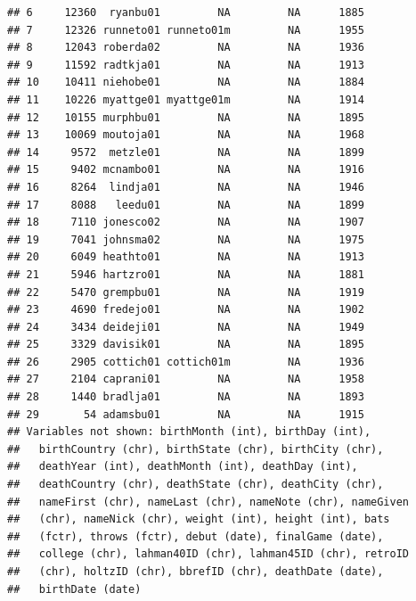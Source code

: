 \documentclass{beamer}\usepackage[]{graphicx}\usepackage[]{color}
\makeatletter
\newenvironment{kframe}{%
 \def\at@end@of@kframe{}%
 \ifinner\ifhmode%
  \def\at@end@of@kframe{\end{minipage}}%
  \begin{minipage}{\columnwidth}%
 \fi\fi%
 \def\FrameCommand##1{\hskip\@totalleftmargin \hskip-\fboxsep
 \colorbox{shadecolor}{##1}\hskip-\fboxsep
     \hskip-\linewidth \hskip-\@totalleftmargin \hskip\columnwidth}%
 \MakeFramed {\advance\hsize-\width
   \@totalleftmargin\z@ \linewidth\hsize
   \@setminipage}}%
 {\par\unskip\endMakeFramed%
 \at@end@of@kframe}
\newenvironment{knitrout}{}{} %
\makeatother
\begin{document}
\begin{frame}
\begin{knitrout}
\begin{kframe}
\begin{verbatim}
## 6     12360  ryanbu01         NA         NA      1885
## 7     12326 runneto01 runneto01m         NA      1955
## 8     12043 roberda02         NA         NA      1936
## 9     11592 radtkja01         NA         NA      1913
## 10    10411 niehobe01         NA         NA      1884
## 11    10226 myattge01 myattge01m         NA      1914
## 12    10155 murphbu01         NA         NA      1895
## 13    10069 moutoja01         NA         NA      1968
## 14     9572  metzle01         NA         NA      1899
## 15     9402 mcnambo01         NA         NA      1916
## 16     8264  lindja01         NA         NA      1946
## 17     8088   leedu01         NA         NA      1899
## 18     7110 jonesco02         NA         NA      1907
## 19     7041 johnsma02         NA         NA      1975
## 20     6049 heathto01         NA         NA      1913
## 21     5946 hartzro01         NA         NA      1881
## 22     5470 grempbu01         NA         NA      1919
## 23     4690 fredejo01         NA         NA      1902
## 24     3434 deideji01         NA         NA      1949
## 25     3329 davisik01         NA         NA      1895
## 26     2905 cottich01 cottich01m         NA      1936
## 27     2104 caprani01         NA         NA      1958
## 28     1440 bradlja01         NA         NA      1893
## 29       54 adamsbu01         NA         NA      1915
## Variables not shown: birthMonth (int), birthDay (int),
##   birthCountry (chr), birthState (chr), birthCity (chr),
##   deathYear (int), deathMonth (int), deathDay (int),
##   deathCountry (chr), deathState (chr), deathCity (chr),
##   nameFirst (chr), nameLast (chr), nameNote (chr), nameGiven
##   (chr), nameNick (chr), weight (int), height (int), bats
##   (fctr), throws (fctr), debut (date), finalGame (date),
##   college (chr), lahman40ID (chr), lahman45ID (chr), retroID
##   (chr), holtzID (chr), bbrefID (chr), deathDate (date),
##   birthDate (date)
\end{verbatim}
\end{kframe}
\end{knitrout}
\end{frame} 
\end{document}
